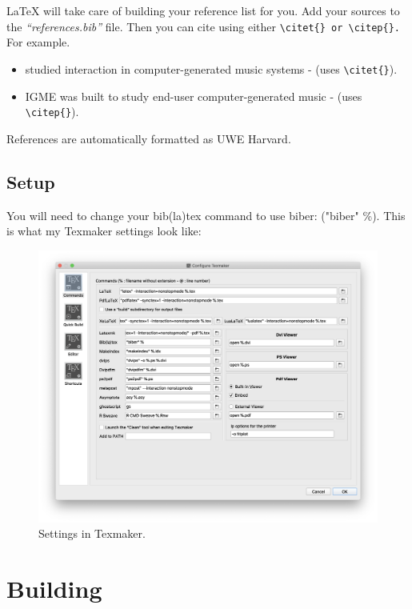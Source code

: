 \LaTeX{} will take care of building your reference list for you. Add your sources to the \textit{``references.bib''} file. Then you can cite using either \verb|\citet{} or \citep{}.| For example.

\begin{itemize}
\item \citet{hunt2020nime} studied interaction in computer-generated music systems - (uses \verb|\citet{}|).
\item IGME was built to study end-user computer-generated music \citep{hunt2020nime} - (uses \verb|\citep{}|).
\end{itemize}

References are automatically formatted as UWE Harvard. 

\subsection{Setup}

You will need to change your bib(la)tex command to use biber: ("biber" \%). This is what my Texmaker settings look like:

\begin{figure}[h]
  \includegraphics[width=\linewidth]{Images/texmaker}
  \caption{Settings in Texmaker.}
  \label{fig:igme1}
\end{figure}

\section{Building}

